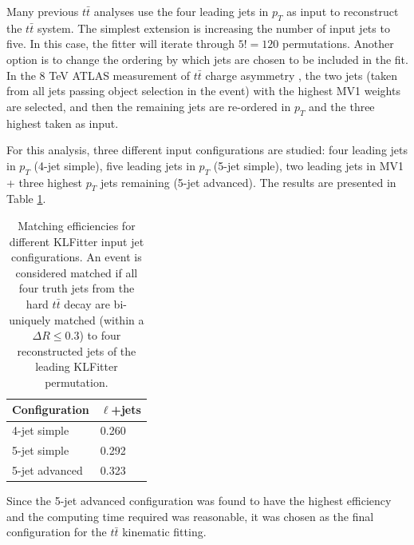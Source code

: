 Many previous $t\bar{t}$ analyses use the four leading jets in $p_{T}$ as input to reconstruct the $t\bar{t}$ system. The simplest extension is increasing the number of input jets to five. In this case, the fitter will iterate through $5!=120$ permutations. Another option is to change the ordering by which jets are chosen to be included in the fit. In the 8 TeV ATLAS measurement of $t\bar{t}$ charge asymmetry \cite{Juste:1647184}, the two jets (taken from all jets passing object selection in the event) with the highest MV1 weights are selected, and then the remaining jets are re-ordered in $p_{T}$ and the three highest taken as input. 

For this analysis, three different input configurations are studied: four leading jets in $p_{T}$ (4-jet simple), five leading jets in $p_{T}$ (5-jet simple), two leading jets in MV1 + three highest $p_{T}$ jets remaining (5-jet advanced). The results are presented in Table \ref{tab:matchEff}.

\begin{table}[]
\centering
\begin{tabular}{l|l}
\hline \hline
Configuration  & $\ell$+jets \\ \hline
4-jet simple     &  0.260   \\
5-jet simple     &  0.292   \\
5-jet advanced   &  0.323   \\ \hline \hline
\end{tabular}
\caption{Matching efficiencies for different KLFitter input jet configurations. An event is considered matched if all four truth jets from the hard $t\bar{t}$ decay are bi-uniquely matched (within a $\Delta R\leq 0.3$) to four reconstructed jets of the leading KLFitter permutation.}
\label{tab:matchEff}
\end{table}

Since the 5-jet advanced configuration was found to have the highest efficiency and the computing time required was reasonable, it was chosen as the final configuration for the $t\bar{t}$ kinematic fitting.


